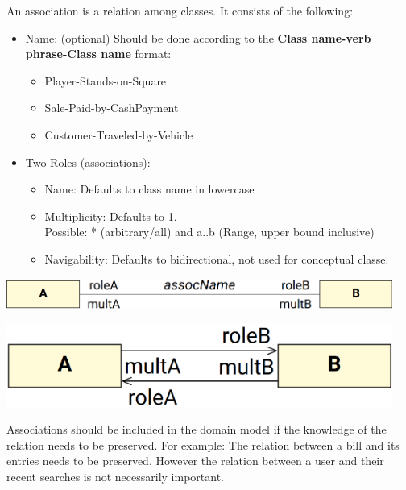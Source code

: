 \documentclass[
../../Software_Engineering_Summary.tex,
]
{subfiles}
\begin{document}
\begin{defbox}
    An association is a relation among classes. It consists of the following:
    \begin{itemize}
        \item Name: (optional) Should be done according to the \textbf{Class name-verb phrase-Class name} format:
        \begin{itemize}
            \item \color{teal}Player-\color{magenta}Stands-on\color{teal}-Square
            \item \color{teal}Sale-\color{magenta}Paid-by\color{teal}-CashPayment
            \item \color{teal}Customer-\color{magenta}Traveled-by\color{teal}-Vehicle
        \end{itemize}
        \item Two Roles (associations):
        \begin{itemize}
            \item Name: Defaults to class name in lowercase
            \item Multiplicity: Defaults to 1. \\ Possible: * (arbitrary/all) and a..b (Range, upper bound inclusive)
            \item Navigability: Defaults to bidirectional, not used for conceptual classe.
        \end{itemize}
    \end{itemize}
    \begin{minipage}
        [m]{0.6\textwidth}
        \centering
        \includegraphics[width=0.95\textwidth]{Pics/04/UMLClassesAssociations.png}
    \end{minipage}
    \hfill
    \begin{minipage}
        [m]{0.4\textwidth}
        \centering
        \includegraphics[width=0.95\textwidth]{Pics/04/UMLClassesDirectional.png}
    \end{minipage}

    Associations should be included in the domain model if the knowledge of the relation needs to be preserved. For example: The relation between a bill and its entries needs to be preserved. However the relation between a user and their recent searches is not necessarily important.
\end{defbox}
\end{document}
